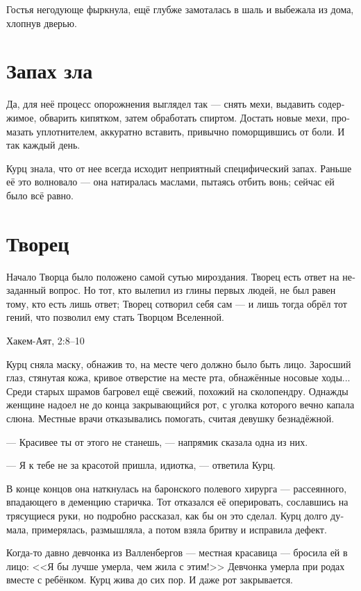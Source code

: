 \documentclass[a4paper,12pt,fleqn]{book}\usepackage{cooltooltips}\usepackage{polyglossia}\setdefaultlanguage[babelshorthands=true]{russian}\setotherlanguage{english}\defaultfontfeatures{Ligatures=TeX,Mapping=tex-text} \usepackage{xcolor}\definecolor{lightgray}{HTML}{bbbbbb}\color{lightgray}\newcommand{\ml}[3]{\textenglish{\textcolor{black}{#3}}}
\begin{document}
Гостья негодующе фыркнула, ещё глубже замоталась в шаль и выбежала из дома, хлопнув дверью.

\section{Запах зла}

Да, для неё процесс опорожнения выглядел так --- снять мехи, выдавить содержимое, обварить кипятком, затем обработать спиртом.
Достать новые мехи, промазать уплотнителем, аккуратно вставить, привычно поморщившись от боли.
И так каждый день.

Курц знала, что от нее всегда исходит неприятный специфический запах.
Раньше её это волновало --- она натиралась маслами, пытаясь отбить вонь;
сейчас ей было всё равно.

\section{Творец}

\epigraph{Начало Творца было положено самой сутью мироздания.
Творец есть ответ на незаданный вопрос.
Но тот, кто вылепил из глины первых людей, не был равен тому, кто есть лишь ответ;
Творец сотворил себя сам --- и лишь тогда обрёл тот гений, что позволил ему стать Творцом Вселенной.}
{Хакем-Аят, 2:8--10}

Курц сняла маску, обнажив то, на месте чего должно было быть лицо.
Заросший глаз, стянутая кожа, кривое отверстие на месте рта, обнажённые носовые ходы...
Среди старых шрамов багровел ещё свежий, похожий на сколопендру.
Однажды женщине надоел не до конца закрывающийся рот, с уголка которого вечно капала слюна.
Местные врачи отказывались помогать, считая девушку безнадёжной.

--- Красивее ты от этого не станешь, --- напрямик сказала одна из них.

--- Я к тебе не за красотой пришла, идиотка, --- ответила Курц.

В конце концов она наткнулась на баронского полевого хирурга --- рассеянного, впадающего в деменцию старичка.
Тот отказался её оперировать, сославшись на трясущиеся руки, но подробно рассказал, как бы он это сделал.
Курц долго думала, примерялась, размышляла, а потом взяла бритву и исправила дефект.

Когда-то давно девчонка из Валленбергов --- местная красавица --- бросила ей в лицо:
<<Я бы лучше умерла, чем жила с этим!>>
Девчонка умерла при родах вместе с ребёнком.
Курц жива до сих пор.
И даже рот закрывается.
\end{document}
